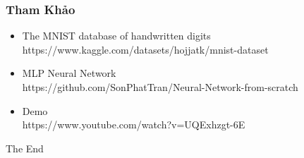 \documentclass{beamer}
\begin{document}
\begin{frame}
\frametitle{Tham Khảo}

\begin{itemize}
    \item The MNIST database of handwritten digits \\https://www.kaggle.com/datasets/hojjatk/mnist-dataset
    \item MLP Neural Network \\https://github.com/SonPhatTran/Neural-Network-from-scratch
    \item Demo 
    \\https://www.youtube.com/watch?v=UQExhzgt-6E
\end{itemize}


\end{frame}

\begin{frame}
\Huge{\centerline{The End}}
\end{frame}

\end{document}
